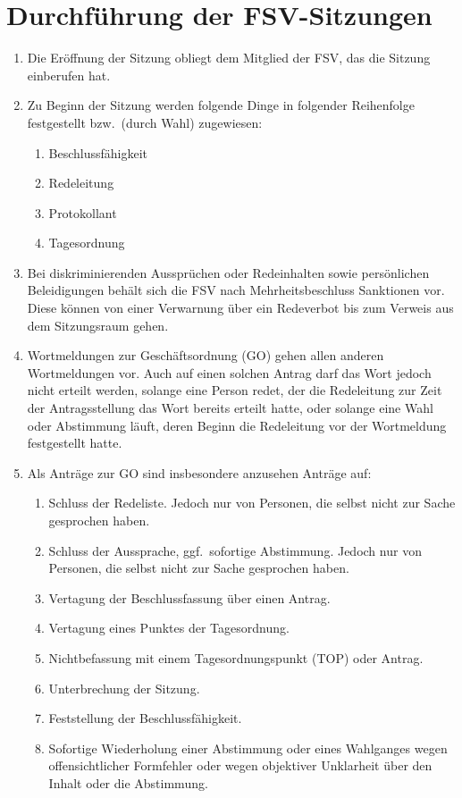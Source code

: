 \section{Durchführung der FSV-Sitzungen}
\begin{enumerate}
	\item Die Eröffnung der Sitzung obliegt dem Mitglied der FSV, das die Sitzung einberufen hat.
	\item Zu Beginn der Sitzung werden folgende Dinge in folgender Reihenfolge festgestellt bzw.\ (durch Wahl) zugewiesen:
	\begin{enumerate}
		\item Beschlussfähigkeit
		\item Redeleitung
		\item Protokollant
		\item Tagesordnung
	\end{enumerate}
	\item Bei diskriminierenden Aussprüchen oder Redeinhalten sowie persönlichen Beleidigungen behält sich die FSV nach Mehrheitsbeschluss Sanktionen vor.
	Diese können von einer Verwarnung über ein Redeverbot bis zum Verweis aus dem Sitzungsraum gehen.
	\item Wortmeldungen zur Geschäftsordnung (GO) gehen allen anderen Wortmeldungen vor.
	Auch auf einen solchen Antrag darf das Wort jedoch nicht erteilt werden, solange eine Person redet, der die Redeleitung zur Zeit der Antragsstellung das Wort bereits erteilt hatte, oder solange eine Wahl oder Abstimmung läuft, deren Beginn die Redeleitung vor der Wortmeldung festgestellt hatte.
	\item Als Anträge zur GO sind insbesondere anzusehen Anträge auf:
	\begin{enumerate}
		\item Schluss der Redeliste.
		Jedoch nur von Personen, die selbst nicht zur Sache gesprochen haben.
		\item Schluss der Aussprache, ggf.\ sofortige Abstimmung.
		Jedoch nur von Personen, die selbst nicht zur Sache gesprochen haben.
		\item Vertagung der Beschlussfassung über einen Antrag.
		\item Vertagung eines Punktes der Tagesordnung.
		\item Nichtbefassung mit einem Tagesordnungspunkt (TOP) oder Antrag.
		\item Unterbrechung der Sitzung.
		\item Feststellung der Beschlussfähigkeit.
		\item Sofortige Wiederholung einer Abstimmung oder eines Wahlganges wegen offensichtlicher Formfehler oder wegen objektiver Unklarheit über den Inhalt oder die Abstimmung.

\end{enumerate}
\end{enumerate}
